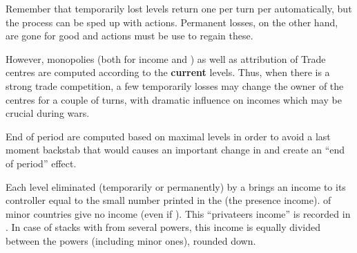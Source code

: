 \begin{playtip}
  Remember that temporarily lost levels return one per turn per \TradeFLEET
  automatically, but the process can be sped up with \TFI actions. Permanent
  losses, on the other hand, are gone for good and \TFI actions must be use to
  regain these.

  However, monopolies (both for income and \VPs) as well as attribution of
  Trade centres are computed according to the \textbf{current} levels. Thus,
  when there is a strong trade competition, a few temporarily losses may
  change the owner of the centres for a couple of turns, with dramatic
  influence on incomes which may be crucial during wars.

  End of period \VPs are computed based on maximal levels in order to avoid a
  last moment backstab that would causes an important change in \VPs and
  create an ``end of period'' effect.
\end{playtip}

 Each level eliminated (temporarily or
permanently) by a \corsaire brings an income to its controller equal to the
small number printed in the \STZ (the presence income). \corsaire of minor
countries give no income (even if \VASSAL).
\bparag This ``privateers income'' is recorded in .
\bparag In case of stacks with \corsaire from several powers, this income is
equally divided between the powers (including minor ones), rounded down.


